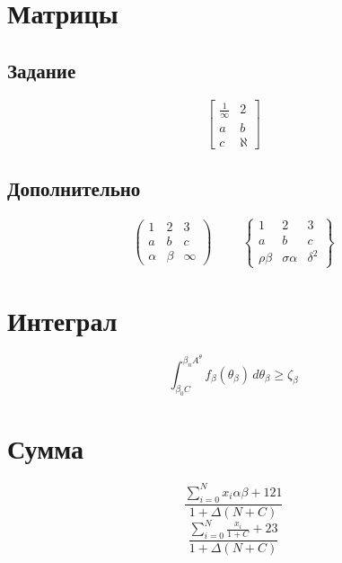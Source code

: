 \documentclass[a4paper, 12pt]{article}
\begin{document}
\graphicspath{{images/}{images2/}} %

\date{27.02.21}
\author{А.Н.Золкин}
\bmstutitlelab

\section{Матрицы}
\subsection{Задание}
$$
  \begin{bmatrix}
    \frac{1}{\infty} & 2      \\
    a                & b      \\
    c                & \aleph
  \end{bmatrix}
$$
\subsection{Дополнительно}
$$
  \begin{pmatrix}
    1      & 2     & 3      \\
    a      & b     & c      \\
    \alpha & \beta & \infty
  \end{pmatrix}
  \hspace{1cm}
  \begin{Bmatrix}
    1         & 2            & 3        \\
    a         & b            & c        \\
    \rho\beta & \sigma\alpha & \delta^2
  \end{Bmatrix}
$$

\section{Интеграл}
\[ \int_{\beta_0C}^{\beta_nA^\theta} f_\beta\left(\theta_\beta\right) \,d\theta_\beta \geqslant \zeta_\beta\]

\section{Сумма}
\[ \frac{ \sum_{i=0}^{N}x_i\alpha\beta + 121}{1 + \Delta(N+C)}\]
\vspace{1cm}
\[ \frac{\displaystyle \sum_{i=0}^{N} \frac{x_i}{1+C} + 23 }{1 + \Delta(N+C)}\]
\end{document}
